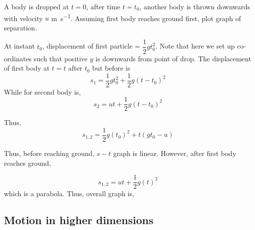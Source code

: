 \begin{example}
    A body is dropped at \(t = 0\), after time \(t = t_0\), another body is thrown downwards with
    velocity \(u\) \unit{\meter\per\second}. Assuming first body reaches ground first, plot graph
    of separation.

    \begin{soln}
        At instant \(t_0\), displacement of first particle = \(\dfrac{1}{2}gt_{0}^2\). Note that here
        we set up co-ordinates such that positive \(y\) is downwards from point of drop. The displacement 
        of first body at \(t = t\) after \(t_0\) but before  is
        \begin{equation}
            s_1 = \frac{1}{2}gt_{0}^2 + \frac{1}{2}g(t-t_0)^2
        \end{equation}
        While for second body is,
        \begin{equation}
            s_2 = ut + \frac{1}{2}g(t-t_0)^2
        \end{equation}

        Thus, 
        \begin{equation}
            s_{1,2} = \frac{1}{2}g(t_0)^2 + t(gt_0 - u)
        \end{equation}

        Thus, before reaching ground, \(s-t\) graph is linear. However, after first body reaches ground,

        \begin{equation}
            s_{1,2} = ut + \frac{1}{2}g(t)^2
        \end{equation}
        which is a parabola. Thus, overall graph is,
        \begin{figure}[H]
            \centering
        \end{figure}
    \end{soln}
\end{example}

\subsection{Motion in higher dimensions}
\label{sec: kin3d}

